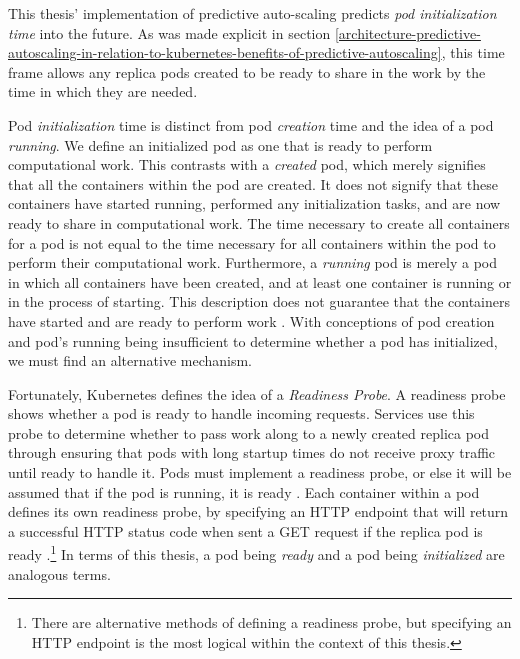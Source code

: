 This thesis' implementation of predictive auto-scaling predicts \textit{pod
initialization time} into the future. As was made explicit in section
\ref{architecture-predictive-autoscaling-in-relation-to-kubernetes-benefits-of-predictive-autoscaling},
this time frame allows any replica pods created to be ready to share in the work by the
time in which they are needed.

Pod \textit{initialization} time is distinct from pod \textit{creation} time and
the idea of a pod \textit{running}. We define an initialized pod as one that is
ready to perform computational work. This contrasts with a \textit{created} pod,
which merely signifies that all the containers within the pod are created. It
does not signify that these containers have started running, performed any
initialization tasks, and are now ready to share in computational work. The time
necessary to create all containers for a pod is not equal to the time necessary
for all containers within the pod to perform their computational work.
Furthermore, a \textit{running} pod is merely a pod in which all containers have
been created, and at least one container is running or in the process of
starting. This description does not guarantee that the containers have started
and are ready to perform work \cite{k8s-pod-states}. With conceptions
of pod creation and pod's
running being insufficient to determine whether a pod has initialized, we must
find an alternative mechanism.

Fortunately, Kubernetes defines the idea of a \textit{Readiness Probe}. A
readiness probe shows whether a pod is ready to handle incoming requests.
Services use this probe to determine whether to pass work along to a newly
created replica pod through ensuring that pods with long startup times do not
receive proxy traffic until ready to handle it. Pods must implement a readiness
probe, or else it will be assumed that if the pod is running, it is ready
\cite{k8s-pod-states}. Each container within a pod defines its own readiness
probe, by specifying an HTTP endpoint that will return a successful HTTP status
code when sent a GET request if the replica pod is ready
\cite{k8s-working-with-containers}.\footnote{There are alternative methods of
defining a readiness probe, but specifying an HTTP endpoint is the most logical
within the context of this thesis.} In terms of this thesis, a
pod being \textit{ready} and a pod being \textit{initialized} are analogous
terms.

